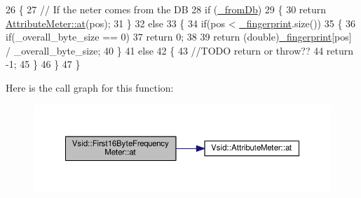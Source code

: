 \begin{DoxyCode}
26 \{
27     \textcolor{comment}{// If the neter comes from the DB}
28     \textcolor{keywordflow}{if} (\hyperlink{class_vsid_1_1_attribute_meter_a2ce3946fc699d3c375ee4019a9e3c022}{\_fromDb})
29     \{
30         \textcolor{keywordflow}{return} \hyperlink{class_vsid_1_1_attribute_meter_a3b067be638ae613a732fa090c07c5e71}{AttributeMeter::at}(pos);
31     \}
32     \textcolor{keywordflow}{else}
33     \{
34         \textcolor{keywordflow}{if}(pos < \hyperlink{class_vsid_1_1_attribute_meter_a0386b2fe9c5d6ab6fba16029d8da4efe}{\_fingerprint}.size())
35         \{
36             \textcolor{keywordflow}{if}(\_overall\_byte\_size == 0)
37                 \textcolor{keywordflow}{return} 0;
38             
39             \textcolor{keywordflow}{return} (\textcolor{keywordtype}{double})\hyperlink{class_vsid_1_1_attribute_meter_a0386b2fe9c5d6ab6fba16029d8da4efe}{\_fingerprint}[pos] / \_overall\_byte\_size;
40         \}
41         \textcolor{keywordflow}{else}
42         \{
43             \textcolor{comment}{//TODO return or throw??}
44             \textcolor{keywordflow}{return} -1;
45         \}
46     \}
47 \}
\end{DoxyCode}


Here is the call graph for this function\-:
\nopagebreak
\begin{figure}[H]
\begin{center}
\leavevmode
\includegraphics[width=350pt]{class_vsid_1_1_first16_byte_frequency_meter_ad34a4919ba3b5187f028423ac3ca23e3_cgraph}
\end{center}
\end{figure}


